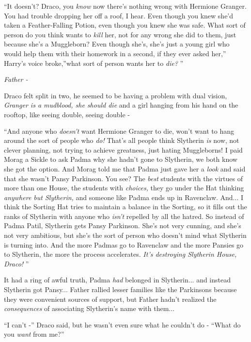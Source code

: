 ``It doesn't? Draco, you \emph{know} now there's nothing wrong with
Hermione Granger. You had trouble dropping her off a roof, I hear. Even
though you knew she'd taken a Feather-Falling Potion, even though you
knew she was safe. What sort of person do you think wants to \emph{kill}
her, not for any wrong she did to them, just because she's a Muggleborn?
Even though she's, she's just a young girl who would help them with
their homework in a second, if they ever asked her,'' Harry's voice
broke,''what sort of person wants her to \emph{die?} ''

\emph{Father -}

Draco felt split in two, he seemed to be having a problem with dual
vision, \emph{Granger is a mudblood, she should die} and a girl hanging
from his hand on the rooftop, like seeing double, seeing double -

``And anyone who \emph{doesn't} want Hermione Granger to die, won't want
to hang around the sort of people who \emph{do!} That's all people think
Slytherin \emph{is} now, not clever planning, not trying to achieve
greatness, just hating Muggleborns! I paid Morag a Sickle to ask Padma
why she hadn't gone to Slytherin, we both know she got the option. And
Morag told me that Padma just gave her a \emph{look} and said that she
wasn't Pansy Parkinson. You see? The \emph{best} students with the
virtues of more than one House, the students with \emph{choices,} they
go under the Hat thinking \emph{anywhere but Slytherin,} and someone
like Padma ends up in Ravenclaw. And... I think the Sorting Hat
tries to maintain a balance in the Sorting, so it fills out the ranks of
Slytherin with anyone who \emph{isn't} repelled by all the hatred. So
instead of Padma Patil, Slytherin gets Pansy Parkinson. She's not very
cunning, and she's not very ambitious, but she's the sort of person who
doesn't mind what Slytherin is turning into. And the more Padmas go to
Ravenclaw and the more Pansies go to Slytherin, the more the process
accelerates. \emph{It's destroying Slytherin House, Draco!} ''

It had a ring of awful truth, Padma \emph{had} belonged in
Slytherin... and instead Slytherin got Pansy... Father rallied
lesser families like the Parkinsons because they were convenient sources
of support, but Father hadn't realized the \emph{consequences} of
associating Slytherin's name with them...

``I can't -'' Draco said, but he wasn't even sure what he couldn't do -
``What do you \emph{want} from me?''

